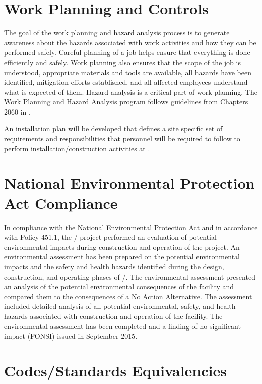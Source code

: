 \section{Work Planning and Controls}

The goal of the work planning and hazard analysis process is to
generate awareness about the hazards associated with work activities
and how they can be performed safely. Careful planning of a job helps
ensure that everything is done efficiently and safely. Work planning also
ensures that the scope of the job is understood, appropriate materials
and tools are available, all hazards have been identified, mitigation
efforts established, and all affected employees understand what is
expected of them. Hazard analysis is a critical part of work planning.
The Work Planning and Hazard Analysis program follows guidelines from
Chapters 2060 in .

An installation  plan will be developed
that defines a site specific set of  requirements and
responsibilities that personnel will be required to follow to perform
installation/construction activities at \surf.

\section{National Environmental Protection Act Compliance}

In compliance with the National Environmental Protection Act 
and in accordance with  Policy 451.1, the
/ project performed an evaluation of potential
environmental impacts during construction and operation of the
project.  An environmental assessment has been prepared on the potential environmental impacts and the safety and health
hazards identified during the design, construction, and operating
phases of /.  The environmental assessment presented an analysis of the potential
environmental consequences of the facility and compared them to the
consequences of a No Action Alternative. The assessment included
detailed analysis of all potential environmental, safety, and health
hazards associated with construction and operation of the facility.
The environmental assessment has been completed and a finding of no significant impact (FONSI)
issued in September 2015.

\section{Codes/Standards Equivalencies}
\label{sec:esh_codes}

